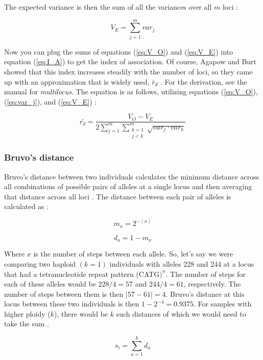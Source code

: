 \documentclass[letterpaper]{article}
\newcommand{\beq}{\begin{equation}}
\newcommand{\eeq}{\end{equation}}
\newcommand{\tab}{\hspace*{1em}}
\begin{document}
The expected variance is then the sum of all the variances over all $m$ loci \cite{Agapow:2001}:

\beq
\label{eq:V_E}
V_E = \displaystyle \sum_{j=1}^{m} var_j
\eeq

Now you can plug the sums of equations (\ref{eq:V_O}) and (\ref{eq:V_E}) into equation (\ref{eq:I_A}) to get the index of association.
Of course, Agapow and Burt showed that this index increases steadily with the number of loci, so they came up with an approximation that is widely used, $\bar r_d$ \cite{Agapow:2001}. For the derivation, see the manual for \textit{multilocus}. The equation is as follows, utilizing equations (\ref{eq:V_O}), (\ref{eq:var_j}), and (\ref{eq:V_E}) \cite{Agapow:2001}:

\beq
\label{eq:r_d}
\bar{r_d} = \frac{V_O - V_E}
{2\displaystyle \sum_{j=1}^{m}\displaystyle \sum_{\substack{k=1\\ j<k}}^{m}\sqrt{var_j\cdot{}var_k}}
\eeq

\subsubsection{Bruvo's distance}\label{appendix:algorithm:bruvo}

\tab \tab Bruvo's distance between two individuals calculates the minimum distance across all combinations of possible pairs of alleles at a single locus and then averaging that distance across all loci \cite{Bruvo:2004}. The distance between each pair of alleles is calculated as \cite{Bruvo:2004}:

\beq
\label{eq:m_x}
m_x = 2^{-\mid x \mid}
\eeq

\beq
\label{eq:d_a}
d_a = 1 - m_x
\eeq

Where $x$ is the number of steps between each allele. So, let's say we were comparing two haploid $(k = 1)$ individuals with alleles 228 and 244 at a locus that had a tetranucleotide repeat pattern (CATG$)^n$. The number of steps for each of these alleles would be $228/4 = 57$ and $244/4 =61$, respectively. The number of steps between them is then $\mid 57 - 61 \mid = 4$. Bruvo's distance at this locus between these two individuals is then $1-2^{-4} = 0.9375$. For samples with higher ploidy ($k$), there would be $k$ such distances of which we would need to take the sum \cite{Bruvo:2004}.

\beq
\label{eq:s_i}
s_i = \displaystyle \sum_{a=1}^{k} d_a
\eeq
\end{document}
